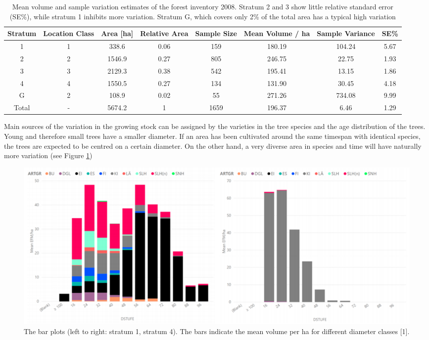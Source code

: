 \begin{table}[H]
\setlength\arrayrulewidth{1pt}  
\centering
\begin{adjustbox}{max width=\textwidth}
\begin{tabular}{|c |c |c |c |c |c |c |c|}
\hline 
\rowcolor{Gray}
\textbf{Stratum} & \textbf{Location Class} & \textbf{Area [ha]} & \textbf{Relative Area} & \textbf{Sample Size} & \textbf{Mean Volume / ha} & \textbf{Sample Variance} & \textbf{SE\%} \\ 
\hline 
1 & 1 & 338.6 & 0.06 & 159 & 180.19 & 104.24 & 5.67 \\ 
\hline 
2 & 2 & 1546.9 & 0.27 & 805 & 246.75 & 22.75 & 1.93 \\ 
\hline 
3 & 3 & 2129.3 & 0.38 & 542 & 195.41 & 13.15 & 1.86 \\ 
\hline 
4 & 4 & 1550.5 & 0.27 & 134 & 131.90 & 30.45 & 4.18 \\ 
\hline 
G & 2 & 108.9 & 0.02 & 55 & 271.26 & 734.08 & 9.99 \\ 
\hline 
\rowcolor{SeaBlue}
Total & - & 5674.2 & 1 & 1659 & 196.37 & 6.46 & 1.29 \\ 
\hline 
\end{tabular} 
\end{adjustbox}
\caption{Mean volume and sample variation estimates of the forest inventory 2008. Stratum 2 and 3 show little relative standard
error (SE\%), while stratum 1 inhibits more variation. Stratum G, which covers only 2\% of the total area has a typical high variation}
\label{tab:Sample_Variation}
\end{table}

Main sources of the variation in the growing stock can be assigned by the varieties in the tree species and the age distribution of the trees. Young and therefore small trees have a smaller diameter. If an area has been cultivated around the same timespan with identical species, the trees are expected to be centred on a certain diameter. On the other hand, a very diverse area in species and time will have naturally more variation (see Figure \ref{fig:barplots_Gartow})

\begin{figure}[H]
  \includegraphics[width=\textwidth]{barplots_Gartow.png}
  \caption{The bar plots (left to right: stratum 1, stratum 4). The bars indicate the mean volume per ha for different diameter classes [1].}
  \label{fig:barplots_Gartow}
\end{figure}


